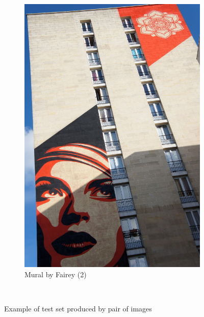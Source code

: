 \documentclass{article}
\begin{document}
\begin{figure}
{\begin{subfigure}[t]{0.50\textwidth}
			\includegraphics[width=\textwidth]{images/pair_example2}
			\caption{Mural by Fairey (2)}
			\label{fig:fairey2}
		\end{subfigure}%
	}%
	\\
	\label{fig:fairey}
	\caption{Example of test set produced by pair of images}
\end{figure}
\end{document}
